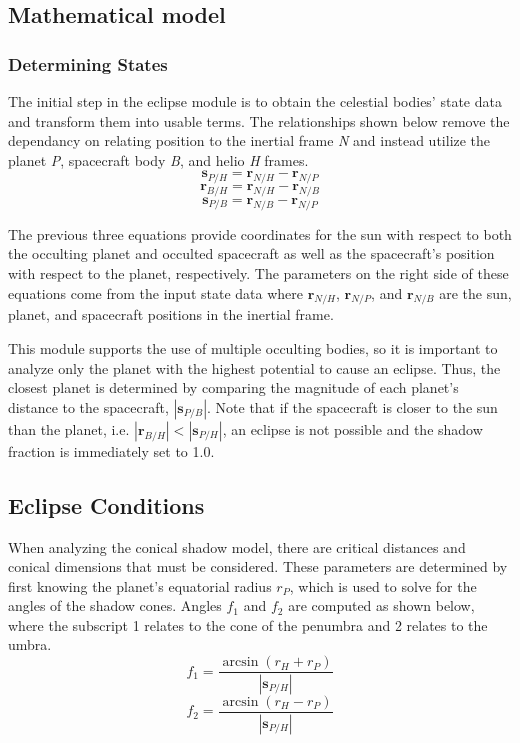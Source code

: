 \subsection{Mathematical model}

\subsubsection{Determining States}
The initial step in the eclipse module is to obtain the celestial bodies' state data and transform them into usable terms. The relationships shown below remove the dependancy on relating position to the inertial frame \textit{N} and instead utilize the planet \textit{P}, spacecraft body \textit{B}, and helio \textit{H} frames.
\begin{equation} \label{eq:1}
\bm{s}_{P/H} = \bm{r}_{N/H} - \bm{r}_{N/P}
\end{equation}
\begin{equation} \label{eq:2}
\bm{r}_{B/H} = \bm{r}_{N/H} - \bm{r}_{N/B}
\end{equation}
\begin{equation} \label{eq:3}
\bm{s}_{P/B} = \bm{r}_{N/B} - \bm{r}_{N/P}
\end{equation}

The previous three equations provide coordinates for the sun with respect to both the occulting planet and occulted spacecraft as well as the spacecraft's position with respect to the planet, respectively. The parameters on the right side of these equations come from the input state data where $\bm{r}_{N/H}$, $\bm{r}_{N/P}$, and $\bm{r}_{N/B}$ are the sun, planet, and spacecraft positions in the inertial frame.

This module supports the use of multiple occulting bodies, so it is important to analyze only the planet with the highest potential to cause an eclipse. Thus, the closest planet is determined by comparing the magnitude of each planet's distance to the spacecraft, $|\bm{s}_{P/B}|$. Note that if the spacecraft is closer to the sun than the planet, i.e. $|\bm{r}_{B/H}| < |\bm{s}_{P/H}|$, an eclipse is not possible and the shadow fraction is immediately set to 1.0.

\subsection{Eclipse Conditions}
When analyzing the conical shadow model, there are critical distances and conical dimensions that must be considered. These parameters are determined by first knowing the planet's equatorial radius $r_P$, which is used to solve for the angles of the shadow cones. Angles $f_1$ and $f_2$ are computed as shown below, where the subscript 1 relates to the cone of the penumbra and 2 relates to the umbra.
\begin{equation} \label{eq:7}
f_1 = \frac{\arcsin(r_H + r_P)}{|\bm{s}_{P/H}|}
\end{equation}
 \begin{equation} \label{eq:8}
 f_2 = \frac{\arcsin(r_H - r_P)}{|\bm{s}_{P/H}|}
 \end{equation}

